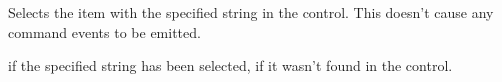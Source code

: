 

\label{wxcontrolwithitemssetstringselection}


Selects the item with the specified string in the control. This doesn't cause
any command events to be emitted.




\true if the specified string has been selected, \false if it wasn't found in
the control.



